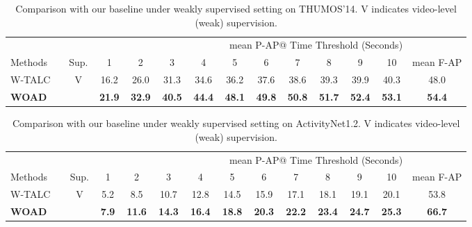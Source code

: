 \documentclass[final]{cvpr}
\begin{document}
\begin{table*}[ht]
    \centering
    \begin{tabular}{l|c||c|c|c|c|c|c|c|c|c|c||c}
        \multicolumn{12}{c}{\ \ \ \ \ \ \ \ \ \ \ \ \ \ \ \ \ \ \ \ \ \ \ \ \ \ \ \ \ \ \ \ \ \ \ \ \ \ \ \ \ \ \ \ \ mean P-AP@ Time Threshold (Seconds)} \\
        Methods & Sup. & 1 & 2 & 3 & 4 & 5 & 6 & 7 & 8 & 9 & 10 & mean F-AP\\
        \midrule
        W-TALC~\cite{paul2018w}& \multirow{2}{*}{V}& 16.2& 26.0& 31.3& 34.6& 36.2& 37.6& 38.6& 39.3& 39.9&  40.3& 48.0\\
        \cmidrule{1-1} \cmidrule{3-13}
        \textbf{WOAD} & & \textbf{21.9} & \textbf{32.9} & \textbf{40.5} & \textbf{44.4} &\textbf{48.1} & \textbf{49.8} &\textbf{50.8}&\textbf{51.7} &\textbf{52.4} & \textbf{53.1} & \textbf{54.4}\\
    \end{tabular}
    \caption{Comparison with our baseline under weakly supervised setting on THUMOS'14. V indicates video-level (weak) supervision.}
    \label{tab: thumos_weak_compare}
\end{table*}

\begin{table*}[ht]
    \centering
    \begin{tabular}{l|c||c|c|c|c|c|c|c|c|c|c||c}
        \multicolumn{12}{c}{\ \ \ \ \ \ \ \ \ \ \ \ \ \ \ \ \ \ \ \ \ \ \ \ \ \ \ \ \ \ \ \ \ \ \ \ \ \ \ \ \ \ \ \ \ mean P-AP@ Time Threshold (Seconds)} \\
        Methods & Sup. & 1 & 2 & 3 & 4 & 5 & 6 & 7 & 8 & 9 & 10 & mean F-AP\\
        \midrule
        W-TALC~\cite{paul2018w}& \multirow{2}{*}{V}& 5.2& 8.5& 10.7& 12.8& 14.5& 15.9&17.1 &18.1 &19.1 &20.1  &53.8 \\
        \cmidrule{1-1} \cmidrule{3-13}
        \textbf{WOAD} & &\textbf{7.9}&\textbf{11.6}&\textbf{14.3}&\textbf{16.4}&\textbf{18.8}&\textbf{20.3}&\textbf{22.2}&\textbf{23.4}&\textbf{24.7}&\textbf{25.3}& \textbf{66.7}\\
    \end{tabular}
    \caption{Comparison with our baseline under weakly supervised setting on ActivityNet1.2. V indicates video-level (weak) supervision.}
    \label{tab: activity1.2_weak_compare}
\end{table*}
\end{document}
